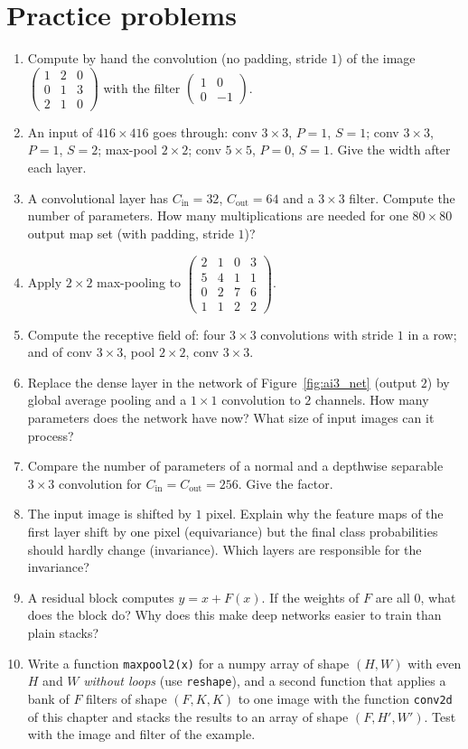 \section*{Practice problems}
\begin{enumerate}[label=\textbf{\thechapter.\arabic*}]
  \item Compute by hand the convolution (no padding, stride $1$) of the image $\begin{pmatrix}1&2&0\\0&1&3\\2&1&0\end{pmatrix}$ with the filter $\begin{pmatrix}1&0\\0&-1\end{pmatrix}$.
  \item An input of $416\times416$ goes through: conv $3\times3$, $P=1$, $S=1$; conv $3\times3$, $P=1$, $S=2$; max-pool $2\times2$; conv $5\times5$, $P=0$, $S=1$. Give the width after each layer.
  \item A convolutional layer has $C_\text{in}=32$, $C_\text{out}=64$ and a $3\times3$ filter. Compute the number of parameters. How many multiplications are needed for one $80\times80$ output map set (with padding, stride $1$)?
  \item Apply $2\times2$ max-pooling to $\begin{pmatrix}2&1&0&3\\5&4&1&1\\0&2&7&6\\1&1&2&2\end{pmatrix}$.
  \item Compute the receptive field of: four $3\times3$ convolutions with stride $1$ in a row; and of conv $3\times3$, pool $2\times2$, conv $3\times3$.
  \item Replace the dense layer in the network of Figure~\ref{fig:ai3_net} (output $2$) by global average pooling and a $1\times1$ convolution to $2$ channels. How many parameters does the network have now? What size of input images can it process?
  \item Compare the number of parameters of a normal and a depthwise separable $3\times3$ convolution for $C_\text{in}=C_\text{out}=256$. Give the factor.
  \item The input image is shifted by $1$ pixel. Explain why the feature maps of the first layer shift by one pixel (equivariance) but the final class probabilities should hardly change (invariance). Which layers are responsible for the invariance?
  \item A residual block computes $y=x+F(x)$. If the weights of $F$ are all $0$, what does the block do? Why does this make deep networks easier to train than plain stacks?
  \item[\textbf{\thechapter.10}$\star$] Write a function \texttt{maxpool2(x)} for a numpy array of shape $(H,W)$ with even $H$ and $W$ \emph{without loops} (use \texttt{reshape}), and a second function that applies a bank of $F$ filters of shape $(F,K,K)$ to one image with the function \texttt{conv2d} of this chapter and stacks the results to an array of shape $(F,H',W')$. Test with the image and filter of the example.
\end{enumerate}

